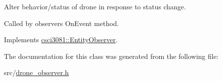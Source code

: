 Alter behavior/status of drone in response to status change. 

Called by observer\textquotesingle{}s On\+Event method. 

Implements \hyperlink{classcsci3081_1_1EntityObserver_ad3188f03b6e68961ffcc415526795867}{csci3081\+::\+Entity\+Observer}.



The documentation for this class was generated from the following file\+:\begin{DoxyCompactItemize}
\item 
src/\hyperlink{drone__observer_8h}{drone\+\_\+observer.\+h}\end{DoxyCompactItemize}
